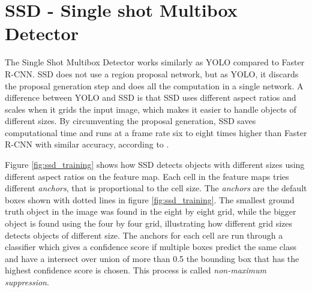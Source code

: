 

\newpage

\section{SSD - Single shot Multibox Detector}
The Single Shot Multibox Detector works similarly as YOLO compared to Faster R-CNN. SSD does not use a region proposal network, but as YOLO, it discards the proposal generation step and does all the computation in a single network. A difference between YOLO and SSD is that SSD uses different aspect ratios and scales when it grids the input image, which makes it easier to handle objects of different sizes. By circumventing the proposal generation, SSD saves computational time and runs at a frame rate six to eight times higher than Faster R-CNN with similar accuracy, according to \citep{SSD}. 



Figure \ref{fig:ssd_training} shows how SSD detects objects with different sizes using different aspect ratios on the feature map. Each cell in the feature maps tries different \textit{anchors}, that is proportional to the cell size. The \textit{anchors} are the default boxes shown with dotted lines in figure \ref{fig:ssd_training}. The smallest ground truth object in the image was found in the eight by eight grid, while the bigger object is found using the four by four grid, illustrating how different grid sizes detects objects of different size. The anchors for each cell are run through a classifier which gives a confidence score if multiple boxes predict the same class and have a intersect over union of more than 0.5 the bounding box that has the highest confidence score is chosen. This process is called \textit{non-maximum suppression}.

